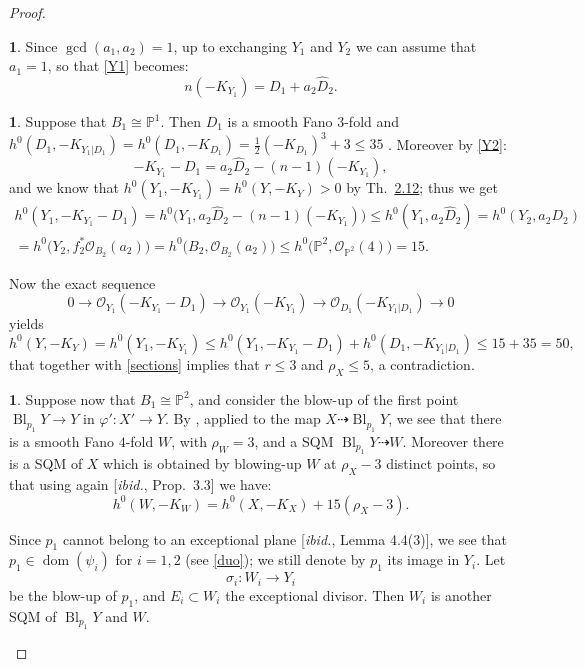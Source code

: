 \documentclass[10pt,a4paper]{amsart}
\theoremstyle{definition}
\newtheorem{prg}[thm]{}
\numberwithin{figure}{section}
\numberwithin{table}{section}
\newcommand{\ph}{\varphi}
\newcommand{\ma}{\mathcal}
\newcommand{\la}{\longrightarrow}
\newcommand{\pr}{\mathbb{P}}
\newcommand{\dom}{\operatorname{dom}}
\newcommand{\Bl}{\operatorname{Bl}}
\begin{document}
\begin{proof}
\begin{prg}
Since $\gcd(a_1,a_2)=1$, 
up to exchanging $Y_1$ and $Y_2$ we can assume that $a_1=1$, so that \eqref{Y1} becomes:
\begin{equation}\label{Y2}
  n(-K_{Y_1})=D_1+a_2\widehat{D}_2.
\end{equation}  
\end{prg}
  \begin{prg}
Suppose that $B_1\cong\pr^1$. Then $D_1$ is a smooth Fano $3$-fold and $h^0(D_1,-K_{Y_1|D_1})=h^0(D_1,-K_{D_1})=\frac{1}{2}(-K_{D_1})^3+3\leq 35$ \cite[Cor.~7.1.2]{fanoEMS}. Moreover by \eqref{Y2}:
$$-K_{Y_1}-D_1=a_2\widehat{D}_2-(n-1)(-K_{Y_1}),$$
and we know that $h^0(Y_1,-K_{Y_1})=h^0(Y,-K_Y)>0$ by Th.~\href{https://arxiv.org/abs/2508.21207v1}{2.12};
thus we get
\begin{gather*}
h^0(Y_1,-K_{Y_1}-D_1)=h^0\bigl(Y_1,a_2\widehat{D}_2-(n-1)(-K_{Y_1})\bigr)\leq 
h^0(Y_1,a_2\widehat{D}_2)
=h^0(Y_2,a_2D_2)\\=h^0\bigl(Y_2,f_2^*\ma{O}_{B_2}(a_2)\bigr)=h^0\bigl(B_2,\ma{O}_{B_2}(a_2)\bigr)\leq
h^0\bigl(\pr^2,\ma{O}_{\pr^2}(4)\bigr)=15.\end{gather*}

Now the exact sequence
$$0\la\ma{O}_{Y_1}(-K_{Y_1}-D_1)\la\ma{O}_{Y_1}(-K_{Y_1})\la\ma{O}_{D_1}(-K_{Y_1|D_1})\la 0$$
yields 
$$h^0(Y,-K_Y)=h^0(Y_1,-K_{Y_1})\leq h^0(Y_1,-K_{Y_1}-D_1)+h^0(D_1,-K_{Y_1|D_1})\leq 15+35=50,$$
that together with \eqref{sections} implies that $r\leq 3$ and $\rho_X\leq 5$, a contradiction.
\end{prg}
  \begin{prg}\label{verylast}
    Suppose now that $B_1\cong\pr^2$, and
consider the blow-up
of the first point
$\Bl_{p_1}Y\to Y$ in $\ph'\colon X'\to Y$. By \cite[Lemma 4.19(1)]{blowup}, applied to the map $X\dasharrow \Bl_{p_1}Y$, we see that there is a smooth Fano $4$-fold $W$, with $\rho_{W}=3$, and a SQM $\Bl_{p_1}Y\dasharrow W$. Moreover there is a SQM of $X$ which is obtained by blowing-up $W$ at $\rho_X-3$ distinct points, so that using again [\emph{ibid.}, Prop.~3.3]
we have:
 \begin{equation}\label{sections2}h^0(W,-K_{W})=h^0(X,-K_X)+15(\rho_X-3).\end{equation}
 
 Since $p_1$ cannot belong to an exceptional plane [\emph{ibid.}, Lemma 4.4(3)], we see that $p_1\in\dom(\psi_i)$ for $i=1,2$ (see \ref{duo}); we still denote by $p_1$ its image in $Y_i$. Let
 $$\sigma_i\colon W_i\la Y_i$$ be the blow-up of $p_1$, and $E_i\subset W_i$ the exceptional divisor.
Then $W_i$ is another SQM of $\Bl_{p_1}Y$ and $W$.


\end{prg}
\end{proof}
\end{document}
